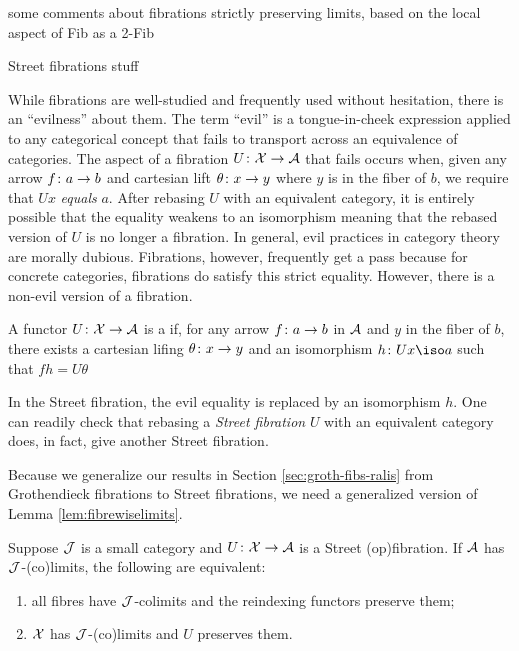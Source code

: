 \documentclass{amsart}
\begin{document}
{\chris some comments about fibrations strictly preserving limits, based on the local aspect of Fib as a 2-Fib}
\cite{Fib2Fib}

{\chris Street fibrations stuff}

While fibrations are well-studied and frequently used
without hesitation, there is an ``evilness'' about them. The
term ``evil'' is a tongue-in-cheek expression applied to any
categorical concept that fails to transport across an
equivalence of categories.  The aspect of a fibration
$ U \colon \mathcal{X} \to \mathcal{A} $ that fails occurs when, given any arrow
$ f \colon a \to b $ and cartesian lift
$ \theta \colon x \to y $ where $ y $ is in the fiber of
$ b $, we require that $ Ux $ \emph{equals} $ a $.  After
rebasing $ U $ with an equivalent category, it is entirely
possible that the equality weakens to an isomorphism meaning
that the rebased version of $ U $ is no longer a
fibration. In general, evil practices in category theory are
morally dubious. Fibrations, however, frequently get a pass
because for concrete categories, fibrations do satisfy this
strict equality.  However, there is a non-evil version of a
fibration.

\begin{defn}

  A functor $ U \colon \mathcal{X} \to \mathcal{A} $ is a  if, for any arrow $ f \colon a \to b $ in $ \mathcal{A}
  $ and $ y $ in the fiber of $ b $, there exists a
  cartesian lifing $ \theta \colon x \to y $ and an
  isomorphism $ h \from Ux \iso a $ such that $ fh = U\theta $
  
\end{defn}

In the Street fibration, the evil equality is replaced by an
isomorphism $ h $.  One can readily check that rebasing a
\emph{Street fibration} $ U $ with an equivalent category
does, in fact, give another Street fibration.

Because we generalize our results in Section
\ref{sec:groth-fibs-ralis} from Grothendieck fibrations to
Street fibrations, we need a generalized version of Lemma
\ref{lem:fibrewiselimits}.

\begin{lem} \label{lem:street-fibrewise-limits}
  Suppose $ \mathcal{J} $ is a small category and $ U \colon \mathcal{X}
  \to \mathcal{A} $ is a Street (op)fibration. If $ \mathcal{A} $ has $ \mathcal{J}
  $-(co)limits, the following are equivalent:
  \begin{enumerate}
  \item
    all fibres have $ \mathcal{J} $-colimits and the
    reindexing functors preserve them;
  \item
    $ \mathcal{X} $ has $ \mathcal{J} $-(co)limits and $ U $ preserves
    them.
  \end{enumerate}
\end{lem}
\end{document}
